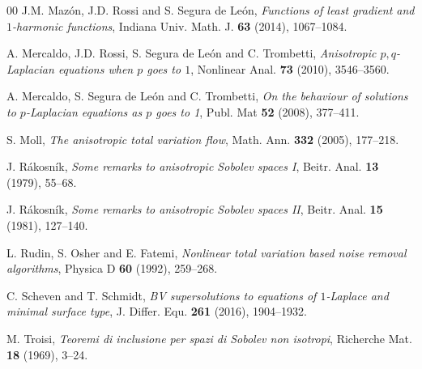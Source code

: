 \documentclass[reqno,12pt]{amsart}
\numberwithin{equation}{section}
\begin{document}
\begin{thebibliography}{00}
 J.M. Mazón, J.D. Rossi and S. Segura de Le\'on, {\it Functions of least gradient and $1$-harmonic functions}, Indiana Univ. Math. J. {\bf 63} (2014), 1067--1084.

 A. Mercaldo, J.D. Rossi, S. Segura de Le\'on and C. Trombetti, {\it Anisotropic $p,q$-Laplacian equations when $p$ goes to $1$}, Nonlinear Anal. {\bf 73} (2010), 3546--3560.

 A. Mercaldo, S. Segura de Le\'on and C. Trombetti, {\it On the behaviour of solutions to $p$-Laplacian equations as $p$ goes to 1}, Publ. Mat {\bf 52} (2008), 377--411.

 S. Moll, {\it The anisotropic total variation flow}, Math. Ann. {\bf 332} (2005), 177--218.

 J. R\'akosn\'ik, {\it Some remarks to anisotropic Sobolev spaces I}, Beitr. Anal. {\bf 13} (1979), 55--68.

 J. R\'akosn\'ik, {\it Some remarks to anisotropic Sobolev spaces II}, Beitr. Anal. {\bf 15} (1981), 127--140.

 L. Rudin, S. Osher and E. Fatemi, {\it Nonlinear total variation based noise removal algorithms}, Physica D {\bf 60} (1992), 259--268.

 C. Scheven and T. Schmidt, {\it BV supersolutions to equations of $1$-Laplace and minimal surface type}, J. Differ. Equ. {\bf 261} (2016), 1904--1932.

 M. Troisi, {\it Teoremi di inclusione per spazi di Sobolev non isotropi}, Richerche Mat. {\bf 18} (1969), 3--24.

\end{thebibliography}
	
\end{document}
